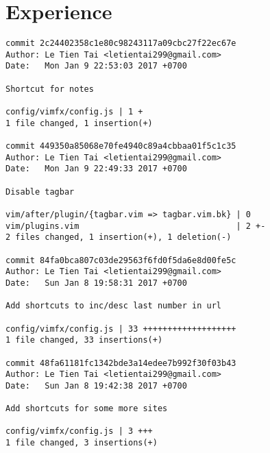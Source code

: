 \section*{Experience}
\begin{verbatim}
commit 2c24402358c1e80c98243117a09cbc27f22ec67e
Author: Le Tien Tai <letientai299@gmail.com>
Date:   Mon Jan 9 22:53:03 2017 +0700

Shortcut for notes

config/vimfx/config.js | 1 +
1 file changed, 1 insertion(+)

commit 449350a85068e70fe4940c89a4cbbaa01f5c1c35
Author: Le Tien Tai <letientai299@gmail.com>
Date:   Mon Jan 9 22:49:33 2017 +0700

Disable tagbar

vim/after/plugin/{tagbar.vim => tagbar.vim.bk} | 0
vim/plugins.vim                                | 2 +-
2 files changed, 1 insertion(+), 1 deletion(-)

commit 84fa0bca807c03de29563f6fd0f5da6e8d00fe5c
Author: Le Tien Tai <letientai299@gmail.com>
Date:   Sun Jan 8 19:58:31 2017 +0700

Add shortcuts to inc/desc last number in url

config/vimfx/config.js | 33 +++++++++++++++++++
1 file changed, 33 insertions(+)

commit 48fa61181fc1342bde3a14edee7b992f30f03b43
Author: Le Tien Tai <letientai299@gmail.com>
Date:   Sun Jan 8 19:42:38 2017 +0700

Add shortcuts for some more sites

config/vimfx/config.js | 3 +++
1 file changed, 3 insertions(+)
\end{verbatim}
